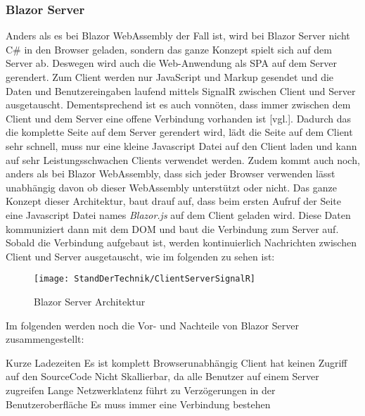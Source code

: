 \subsubsection{Blazor Server}
Anders als es bei Blazor WebAssembly der Fall ist, wird bei Blazor Server nicht C\# in den
Browser geladen, sondern das ganze Konzept spielt sich auf dem Server ab. Deswegen wird auch die
Web-Anwendung als SPA auf dem Server gerendert. Zum Client werden nur JavaScript und Markup
gesendet und die Daten und Benutzereingaben laufend mittels SignalR zwischen Client und Server
ausgetauscht. Dementsprechend ist es auch vonnöten, dass immer zwischen dem Client und dem Server
eine offene Verbindung vorhanden ist \cite{HierKommtBlazor}[vgl.].
\newline
\newline
Dadurch das die komplette Seite auf dem Server gerendert wird, lädt die Seite auf dem Client sehr
schnell, muss nur eine kleine Javascript Datei auf den Client laden und kann auf sehr
Leistungsschwachen Clients verwendet werden. Zudem kommt auch noch, anders als bei Blazor
WebAssembly, dass sich jeder Browser verwenden lässt unabhängig davon ob dieser WebAssembly
unterstützt oder nicht.
\newline
\newline
Das ganze Konzept dieser Architektur, baut drauf auf, dass beim ersten Aufruf der Seite eine
Javascript Datei names \emph{Blazor.js} auf dem Client geladen wird. Diese Daten kommuniziert dann mit
dem DOM und baut die Verbindung zum Server auf. Sobald die Verbindung aufgebaut ist, werden
kontinuierlich Nachrichten zwischen Client und Server ausgetauscht, wie im folgenden zu sehen ist:
\begin{figure}[h]
    \centering
    \texttt{[image: StandDerTechnik/ClientServerSignalR]}
    \caption[Blazor Server Architektur]{Blazor Server Architektur}
    \label{img:clientserversignalR}
\end{figure}

Im folgenden werden noch die Vor- und Nachteile von Blazor Server zusammengestellt:
\begin{itemize}
    \pro Kurze Ladezeiten
    \pro Es ist komplett Browserunabhängig
    \pro Client hat keinen Zugriff auf den SourceCode
    \con Nicht Skallierbar, da alle Benutzer auf einem Server zugreifen
    \con Lange Netzwerklatenz führt zu Verzögerungen in der Benutzeroberfläche
    \con Es muss immer eine Verbindung bestehen
\end{itemize}